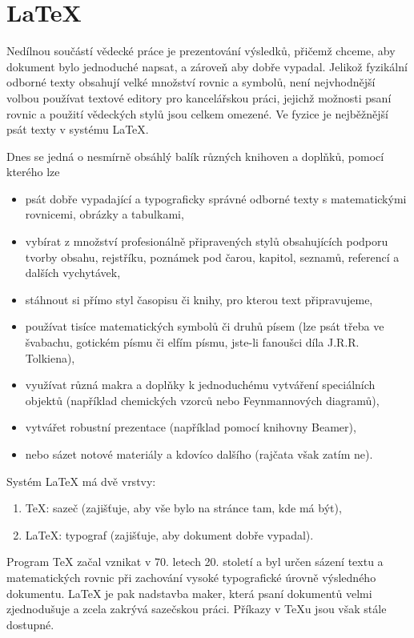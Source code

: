 \documentclass[a4paper,11pt,twoside]{article}
\begin{document}
\section{LaTeX}
    Nedílnou součástí vědecké práce je prezentování výsledků, přičemž chceme, aby dokument bylo jednoduché napsat, a zároveň aby dobře vypadal.
    Jelikož fyzikální odborné texty obsahují velké množství rovnic a symbolů, není nejvhodnější volbou používat textové editory pro kancelářskou práci, jejichž možnosti psaní rovnic a použití vědeckých stylů jsou celkem omezené.
    Ve fyzice je nejběžnější psát texty v systému \LaTeX. 
    
    Dnes se jedná o nesmírně obsáhlý balík různých knihoven a doplňků, pomocí kterého lze
    \begin{itemize}
        \item psát dobře vypadající a typograficky správné odborné texty s matematickými rovnicemi, obrázky a tabulkami,
        \item vybírat z množství profesionálně připravených stylů obsahujících podporu tvorby obsahu, rejstříku, poznámek pod čarou, kapitol, seznamů, referencí a dalších vychytávek,
        \item stáhnout si přímo styl časopisu či knihy, pro kterou text připravujeme, 
        \item používat tisíce matematických symbolů či druhů písem (lze psát třeba ve švabachu, gotickém písmu či elfím písmu, jste-li fanoušci díla J.R.R. Tolkiena),
        \item využívat různá makra a doplňky k jednoduchému vytváření speciálních objektů (například chemických vzorců nebo Feynmannových diagramů),
        \item vytvářet robustní prezentace (například pomocí knihovny Beamer),
        \item nebo sázet notové materiály a kdovíco dalšího (rajčata však zatím ne).
    \end{itemize}

    Systém \LaTeX{} má dvě vrstvy:
    \begin{enumerate}
        \item \TeX{}: sazeč (zajišťuje, aby vše bylo na stránce tam, kde má být),
        \item \LaTeX{}: typograf (zajišťuje, aby dokument dobře vypadal).
    \end{enumerate}
    Program \TeX{} začal vznikat v 70. letech 20. století a byl určen sázení textu a matematických rovnic při zachování vysoké typografické úrovně výsledného dokumentu.
    \LaTeX{} je pak nadstavba maker, která psaní dokumentů velmi zjednodušuje a zcela zakrývá sazečskou práci. 
    Příkazy v \TeX{}u jsou však stále dostupné.
\end{document}
